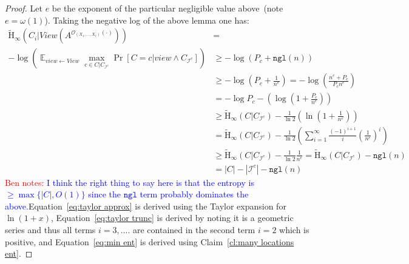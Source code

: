 \documentclass[11pt]{article}
\newcommand{\clref}[1]{\mbox{Claim~\ref{#1}}}
\DeclareMathOperator*{\expe}{\mathbb{E}}
\newcommand{\hillrlx}{\ensuremath{\mathtt{HILL\mhyphen rlx}}\xspace}
\newcommand{\poly}{\ensuremath{\mathtt{poly}}\xspace}
\newcommand{\ngl}{\ensuremath{\mathtt{ngl}}\xspace}
\newcommand{\Hoo}{\mathrm{H}_\infty}
\newcommand{\Hav}{\tilde{\mathrm{H}}_\infty}
\newtheorem{lemma}[theorem]{Lemma}
\newcommand{\authnote}[2]{{\textcolor{red}{\textsf{#1 notes: }\textcolor{blue}{ #2}}\marginpar{\textcolor{red}{\textbf{!!!!!}}}}}
\newcommand{\authnote}[2]{}
\newcommand{\bnote}[1]{{\authnote{Ben}{#1}}}
\begin{document}
\begin{proof}
Let $e$ be the exponent of the particular negligible value above~(note $e = \omega(1)$). 
Taking the negative log of the above lemma one has:
\begin{align}
\Hav(C_i |  View(A^{\mathcal{O}_{(X_1,..., X_\ell)}(\cdot)}))
 &=\nonumber \\
 -\log \left(\expe_{view \leftarrow View}\max_{c\in C|C_{\mathcal{I}^c}}\Pr[C =c | view \wedge C_{\mathcal{I}^c} ]  \right) &\geq -\log (P_c + \ngl(n))\nonumber \\
&\geq -\log(P_c+ \frac{1}{n^{e}} )= -\log \left(\frac{n^{e}+P_c}{P_c n^{e}}\right) \nonumber \\
&=-\log P_c-\left(\log (1+\frac{P_c}{n^e}) \right)\nonumber \\
&\geq \Hav(C | C_{\mathcal{I}^c})-\frac{1}{\ln 2}\left(\ln (1+\frac{1}{n^e}) \right) \nonumber \\
&= \Hav(C | C_{\mathcal{I}^c})- \frac{1}{\ln 2}\left(\sum_{i=1}^\infty \frac{(-1)^{i+1}}{i} (\frac{1}{n^e})^i\right) \label{eq:taylor approx} \\
&\geq \Hav(C | C_{\mathcal{I}^c}) - \frac{1}{\ln 2} \frac{1}{n^e} = \Hav(C | C_{\mathcal{I}^c})-\ngl(n) \label{eq:taylor trunc}\\
&= |C| - |\mathcal{I}^c| -\ngl(n) \label{eq:min ent}
\end{align}
\bnote{I think the right thing to say here is that the entropy is $\geq \max\{ |C|, O(1)\}$ since the $\ngl$ term probably dominates the above.}Equation~\ref{eq:taylor approx} is derived using the Taylor expansion for $\ln(1+x)$, Equation~\ref{eq:taylor trunc} is derived by noting it is a geometric series and thus all terms $i=3,....$ are contained in the second term $i=2$ which is positive, and Equation~\ref{eq:min ent} is derived using \clref{cl:many locations ent}.
\end{proof}
\end{document}
